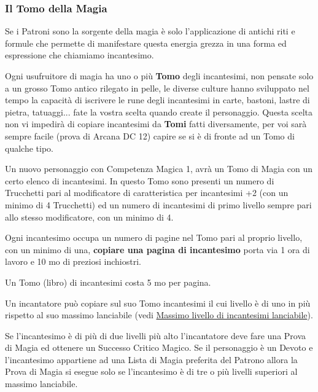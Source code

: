 \begin{multicols}{2}
\subsubsection{Il Tomo della Magia}\label{magietomodellamagia}

Se i Patroni sono la sorgente della magia è solo l'applicazione di antichi riti e formule che permette di manifestare questa energia grezza in una forma ed espressione che chiamiamo incantesimo.

Ogni usufruitore di magia ha uno o più \textbf{Tomo} degli incantesimi, non pensate solo a un grosso Tomo antico rilegato in pelle, le diverse culture hanno sviluppato nel tempo la capacità di iscrivere le rune degli incantesimi in carte, bastoni, lastre di pietra, tatuaggi... fate la vostra scelta quando create il personaggio.
Questa scelta non vi impedirà di copiare incantesimi da \textbf{Tomi} fatti diversamente, per voi sarà sempre facile (prova di Arcana DC 12) capire se si è di fronte ad un Tomo di qualche tipo.

Un nuovo personaggio con Competenza Magica 1, avrà un Tomo di Magia con un certo elenco di incantesimi. In questo Tomo sono presenti un numero di Trucchetti pari al modificatore di caratteristica per incantesimi +2 (con un minimo di 4 Trucchetti) ed un numero di incantesimi di primo livello sempre pari allo stesso modificatore, con un minimo di 4.\label{tomocm1}\hypertarget{tomocm1}{}

Ogni incantesimo occupa un numero di pagine nel Tomo pari al proprio livello, con un minimo di una, \textbf{copiare una pagina di incantesimo} porta via 1 ora di lavoro e 10 mo di preziosi inchiostri.

Un Tomo (libro) di incantesimi costa 5 mo per pagina.

Un incantatore può copiare sul suo Tomo incantesimi il cui livello è di uno in più rispetto al suo massimo lanciabile (vedi \hyperlink{scuoleelivelli}{Massimo livello di incantesimi lanciabile}).

Se l'incantesimo è di più di due livelli più alto l'incantatore deve fare una Prova di Magia ed ottenere un Successo Critico Magico. Se il personaggio è un Devoto e l'incantesimo appartiene ad una Lista di Magia preferita del Patrono allora la Prova di Magia si esegue solo se l'incantesimo è di tre o più livelli superiori al massimo lanciabile.


\end{multicols}
